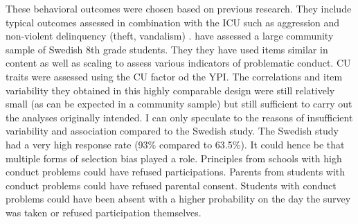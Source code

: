 \documentclass[a4paper,12pt]{article} %
\begin{document}
{These behavioral outcomes were chosen based on previous research. 
They include typical outcomes assessed in combination with the ICU such as aggression and non-violent delinquency (theft, vandalism) \parencite{cardinale_reliability_2017}.
\textcites{andershed_psychopathic_2012} have assessed a large community sample of Swedish 8th grade students.
They they have used items similar in content as well as scaling to assess various indicators of problematic conduct. CU traits were assessed using the CU factor od the YPI.
The correlations and item variability they obtained in this highly comparable design were still relatively small (as can be expected in a community sample) but still sufficient to carry out the analyses originally intended. 
I can only speculate to the reasons of insufficient variability and association compared to the Swedish study. 
The Swedish study had a very high response rate (93\% compared to 63.5\%). 
It could hence be that multiple forms of selection bias played a role.
Principles from schools with high conduct problems could have refused participations. 
Parents from students with conduct problems could have refused parental consent. 
Students with conduct problems could have been absent with a higher probability on the day the survey was taken or refused participation themselves.
  

}
\end{document}
